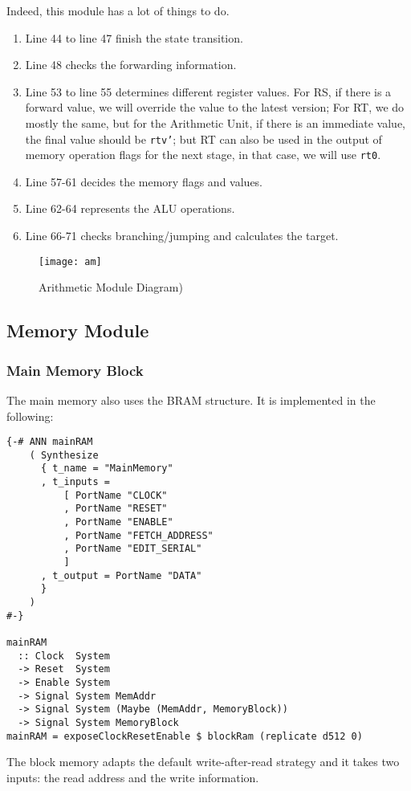 Indeed, this module has a lot of things to do. 
\begin{enumerate}
	\item Line 44 to line 47 finish the state transition. 
	\item Line 48 checks the forwarding information.
	\item Line 53 to line 55 determines different register values. For RS, if there is a forward value, we will override the value to the latest version; For RT, we do mostly the same, but for the Arithmetic Unit, if there is an immediate value, the final value should be \texttt{rtv'}; but RT can also be used in the output of memory operation flags for the next stage, in that case, we will use \texttt{rt0}.
	\item Line 57-61 decides the memory flags and values.
	\item Line 62-64 represents the ALU operations.
	\item Line 66-71 checks branching/jumping and calculates the target.
\end{enumerate}
\begin{figure}[H]
	\centering
	\texttt{[image: am]}
	\caption{Arithmetic Module Diagram)}
\end{figure}
\subsection{Memory Module}
\subsubsection{Main Memory Block}
The main memory also uses the BRAM structure. It is implemented in the following:
\begin{verbatim}
{-# ANN mainRAM
    ( Synthesize
      { t_name = "MainMemory"
      , t_inputs =
          [ PortName "CLOCK"
          , PortName "RESET"
          , PortName "ENABLE"
          , PortName "FETCH_ADDRESS"
          , PortName "EDIT_SERIAL"
          ]
      , t_output = PortName "DATA"
      }
    )
#-}

mainRAM 
  :: Clock  System
  -> Reset  System
  -> Enable System
  -> Signal System MemAddr
  -> Signal System (Maybe (MemAddr, MemoryBlock))
  -> Signal System MemoryBlock
mainRAM = exposeClockResetEnable $ blockRam (replicate d512 0)
\end{verbatim}
The block memory adapts the default write-after-read strategy and it takes two inputs: the read address and the write information. 
